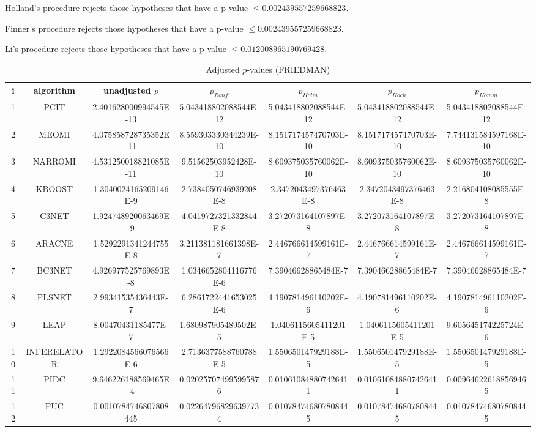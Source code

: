 \documentclass[a4paper,10pt]{article}
\begin{document}
\begin{landscape}
Holland's procedure rejects those hypotheses that have a p-value $\le0.002439557259668823$.


Finner's procedure rejects those hypotheses that have a p-value $\le0.002439557259668823$.


Li's procedure rejects those hypotheses that have a p-value $\le0.012008965190769428$.



\newpage

\begin{table}[!htp]
\centering\scriptsize
\caption{Adjusted $p$-values (FRIEDMAN)}
\begin{tabular}{ccccccc}
i&algorithm&unadjusted $p$&$p_{Bonf}$&$p_{Holm}$&$p_{Hoch}$&$p_{Homm}$\\
\hline
1&PCIT&2.401628000994545E-13&5.043418802088544E-12&5.043418802088544E-12&5.043418802088544E-12&5.043418802088544E-12\\
2&MEOMI&4.075858728735352E-11&8.559303330344239E-10&8.151717457470703E-10&8.151717457470703E-10&7.744131584597168E-10\\
3&NARROMI&4.531250018821085E-11&9.51562503952428E-10&8.609375035760062E-10&8.609375035760062E-10&8.609375035760062E-10\\
4&KBOOST&1.3040024165209146E-9&2.7384050746939208E-8&2.3472043497376463E-8&2.3472043497376463E-8&2.216804108085555E-8\\
5&C3NET&1.924748920063469E-9&4.0419727321332844E-8&3.272073164107897E-8&3.272073164107897E-8&3.272073164107897E-8\\
6&ARACNE&1.5292291341244755E-8&3.211381181661398E-7&2.446766614599161E-7&2.446766614599161E-7&2.446766614599161E-7\\
7&BC3NET&4.926977525769893E-8&1.0346652804116776E-6&7.39046628865484E-7&7.39046628865484E-7&7.39046628865484E-7\\
8&PLSNET&2.99341535436443E-7&6.2861722441653025E-6&4.190781496110202E-6&4.190781496110202E-6&4.190781496110202E-6\\
9&LEAP&8.00470431185477E-7&1.680987905489502E-5&1.0406115605411201E-5&1.0406115605411201E-5&9.605645174225724E-6\\
10&INFERELATOR&1.2922084566076566E-6&2.7136377588760788E-5&1.550650147929188E-5&1.550650147929188E-5&1.550650147929188E-5\\
11&PIDC&9.646226188569465E-4&0.020257074995995876&0.010610848807426411&0.010610848807426411&0.009646226188569465\\
12&PUC&0.0010784746807808445&0.022647968296397734&0.010784746807808445&0.010784746807808445&0.010784746807808445\\

\end{tabular}
\end{table}
\end{landscape}
\end{document}
